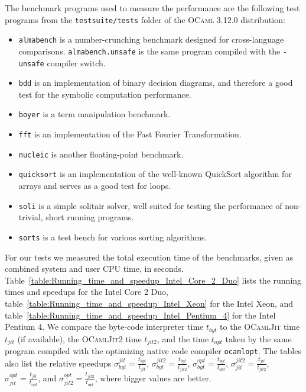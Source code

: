 \documentclass[12pt,a4paper,final]{article}
\begin{document}
The benchmark programs used to measure the performance are the following test programs from the
\texttt{testsuite/tests} folder of the \textsc{OCaml} 3.12.0 distribution:
\begin{itemize}
\item \texttt{almabench} is a number-crunching benchmark designed for cross-language
  comparisons. \texttt{almabench.unsafe} is the same program compiled with the \texttt{-unsafe}
  compiler switch.
\item \texttt{bdd} is an implementation of binary decision diagrams, and therefore a good
  test for the symbolic computation performance.
\item \texttt{boyer} is a term manipulation benchmark.
\item \texttt{fft} is an implementation of the Fast Fourier Transformation.
\item \texttt{nucleic} is another floating-point benchmark.
\item \texttt{quicksort} is an implementation of the well-known QuickSort algorithm
  for arrays and serves as a good test for loops.
\item \texttt{soli} is a simple solitair solver, well suited for testing the performance
  of non-trivial, short running programs.
\item \texttt{sorts} is a test bench for various sorting algorithms.
\end{itemize}

For our tests we measured the total execution time of the benchmarks, given as combined
system and user CPU time, in seconds.
Table~\ref{table:Running_time_and_speedup_Intel_Core_2_Duo}
lists the running times and speedups for the Intel Core 2 Duo,
table~\ref{table:Running_time_and_speedup_Intel_Xeon}
for the Intel Xeon,
and table~\ref{table:Running_time_and_speedup_Intel_Pentium_4}
for the Intel Pentium 4. We compare the byte-code interpreter time $t_{byt}$ to
the \textsc{OCamlJit} time $t_{jit}$ (if available), the \textsc{OCamlJit2} time
$t_{jit2}$, and the time $t_{opt}$ taken by the same program compiled with the
optimizing native code compiler \texttt{ocamlopt}. The tables also list the relative
speedups
$\sigma^{jit}_{byt} = \frac{t_{byt}}{t_{jit}}$,
$\sigma^{jit2}_{byt} = \frac{t_{byt}}{t_{jit2}}$,
$\sigma^{opt}_{byt} = \frac{t_{byt}}{t_{opt}}$,
$\sigma^{jit2}_{jit} = \frac{t_{jit}}{t_{jit2}}$,
$\sigma^{opt}_{jit} = \frac{t_{jit}}{t_{opt}}$, and
$\sigma^{opt}_{jit2} = \frac{t_{jit2}}{t_{opt}}$, where bigger values are better.
\end{document}
